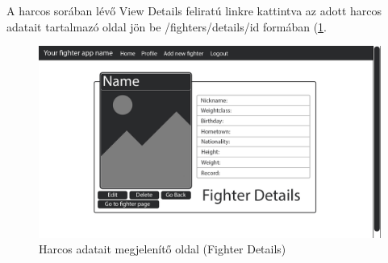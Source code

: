 A harcos sorában lévő View Details feliratú linkre kattintva az adott harcos adatait tartalmazó oldal jön be /fighters/details/id formában (\ref{fig:details}.

\begin{figure}[htb]
\centering
\includegraphics[scale=0.2]{kepek/details.jpeg}
\caption{Harcos adatait megjelenítő oldal (Fighter Details)}
\label{fig:details}
\end{figure}
